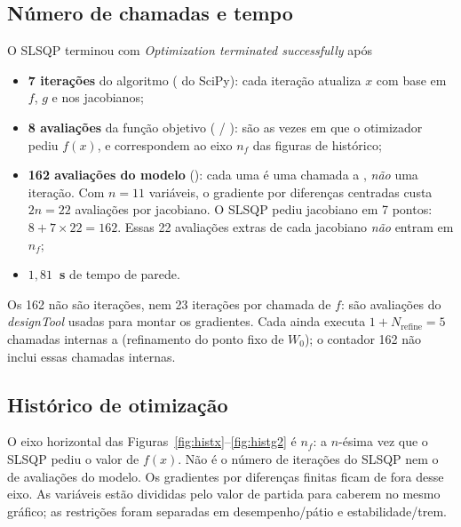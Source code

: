\subsection{Número de chamadas e tempo}
\label{sec:p3q6}

O SLSQP terminou com \emph{Optimization terminated successfully} após
\begin{itemize}
\item \textbf{7 iterações} do algoritmo ( do SciPy): cada
      iteração atualiza $x$ com base em $f$, $g$ e nos jacobianos;
\item \textbf{8 avaliações} da função objetivo
      ( / ): são as vezes em que o
      otimizador pediu $f(x)$, e correspondem ao eixo $n_f$ das figuras
      de histórico;
\item \textbf{162 avaliações do modelo} (): cada
      uma é uma chamada a , \emph{não} uma
      iteração. Com $n=11$ variáveis, o gradiente por diferenças
      centradas custa $2n=22$ avaliações por jacobiano. O SLSQP pediu
      jacobiano em 7 pontos: $8 + 7\times 22 = 162$. Essas 22 avaliações
      extras de cada jacobiano \emph{não} entram em $n_f$;
\item \textbf{$1{,}81$~s} de tempo de parede.
\end{itemize}
Os 162 não são iterações, nem 23 iterações por chamada de $f$: são
avaliações do \emph{designTool} usadas para montar os gradientes.
Cada  ainda executa $1+N_{\mathrm{refine}}=5$
chamadas internas a  (refinamento do ponto fixo de $W_0$);
o contador 162 não inclui essas chamadas internas.

\subsection{Histórico de otimização}
\label{sec:p3q7}

O eixo horizontal das Figuras~\ref{fig:histx}--\ref{fig:histg2} é
$n_f$: a $n$-ésima vez que o SLSQP pediu o valor de $f(x)$. Não é
o número de iterações do SLSQP nem o de avaliações do modelo.
Os gradientes por diferenças finitas ficam de fora
desse eixo. As variáveis estão divididas pelo valor de partida para
caberem no mesmo gráfico; as restrições foram separadas em
desempenho/pátio e estabilidade/trem.


